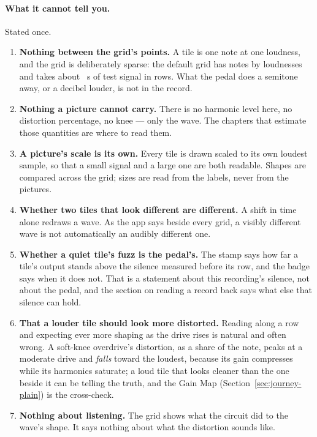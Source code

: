\documentclass[11pt,a4paper]{article}
\begin{document}
\paragraph{What it cannot tell you.} Stated once.
\begin{enumerate}
  \item \textbf{Nothing between the grid's points.} A tile is one note
  at one loudness, and the grid is deliberately sparse: the default grid
  has \wmDefaultDimension{} notes by \wmDefaultDimension{} loudnesses and
  takes about \wmDefaultStimulusS{}~s of test signal in
  \wmDefaultDimension{} rows. What the pedal does a semitone away, or a
  decibel louder, is not in the record.
  \item \textbf{Nothing a picture cannot carry.} There is no harmonic
  level here, no distortion percentage, no knee --- only the wave. The
  chapters that estimate those quantities are where to read them.
  \item \textbf{A picture's scale is its own.} Every tile is drawn scaled
  to its own loudest sample, so that a small signal and a large one are
  both readable. Shapes are compared across the grid; sizes are read from
  the labels, never from the pictures.
  \item \textbf{Whether two tiles that look different are different.} A
  shift in time alone redraws a wave. As the app says beside every grid, a visibly different wave is not automatically an audibly different one.
  \item \textbf{Whether a quiet tile's fuzz is the pedal's.} The stamp
  says how far a tile's output stands above the silence measured before
  its row, and the badge says when it does not. That is a statement about
  this recording's silence, not about the pedal, and the section on
  reading a record back says what else that silence can hold.
  \item \textbf{That a louder tile should look more distorted.} Reading
  along a row and expecting ever more shaping as the drive rises is
  natural and often wrong. A soft-knee overdrive's distortion, as a share
  of the note, peaks at a moderate drive and \emph{falls} toward the
  loudest, because its gain compresses while its harmonics saturate; a
  loud tile that looks cleaner than the one beside it can be telling the
  truth, and the Gain Map (Section~\ref{sec:journey-plain}) is the
  cross-check.
  \item \textbf{Nothing about listening.} The grid shows what the circuit
  did to the wave's shape. It says nothing about what the distortion sounds like.
\end{enumerate}
\end{document}
